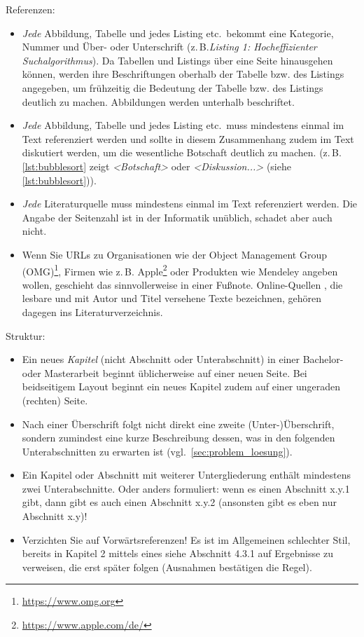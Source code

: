 \documentclass[11pt]{scrartcl}
\newcommand{\qto}[1]{\glqq #1\grqq}				%
\newcommand{\zB}{\mbox{z.\,B.}\xspace}
\newcommand{\bzw}{bzw.\xspace}
\begin{document}
\noindent
Referenzen:	
	\begin{itemize}
		\item \emph{Jede} Abbildung, Tabelle und jedes Listing etc.\ bekommt eine Kategorie, Nummer und Über- oder Unterschrift (\zB \emph{Listing 1: Hocheffizienter Suchalgorithmus}). 
		Da Tabellen und Listings über eine Seite hinausgehen können, werden ihre Beschriftungen oberhalb der Tabelle \bzw des Listings angegeben, um frühzeitig die Bedeutung der Tabelle \bzw des Listings deutlich zu machen. Abbildungen werden unterhalb beschriftet.
		\item \emph{Jede} Abbildung, Tabelle und jedes Listing etc.\ muss mindestens einmal im Text referenziert werden und sollte in diesem Zusammenhang zudem im Text diskutiert werden, um die wesentliche Botschaft deutlich zu machen. (\zB \qto{\cref{lst:bubblesort} zeigt \emph{<Botschaft>}} oder \qto{\emph{<Diskussion...>} (siehe \cref{lst:bubblesort})}). 
		\item \emph{Jede} Literaturquelle muss mindestens einmal im Text referenziert werden. Die Angabe der Seitenzahl ist in der Informatik unüblich, schadet aber auch nicht.
		\item Wenn Sie URLs zu Organisationen wie der Object Management Group (OMG)\footnote{\url{https://www.omg.org}}, Firmen wie \zB Apple\footnote{\url{https://www.apple.com/de/}} oder Produkten wie Mendeley angeben wollen, geschieht das sinnvollerweise in einer Fußnote. Online-Quellen \cite{lit:Gossman:MVVM}, die \qto{lesbare} und mit Autor und Titel versehene Texte bezeichnen, gehören dagegen ins Literaturverzeichnis.
	\end{itemize}
	
% 


\noindent
Struktur:
	\begin{itemize}
	 	\item Ein neues \emph{Kapitel} (nicht Abschnitt oder Unterabschnitt) in einer Bachelor- oder Masterarbeit beginnt üblicherweise auf einer neuen Seite. Bei beidseitigem Layout beginnt ein neues Kapitel zudem auf einer ungeraden (rechten) Seite.
	 	\item Nach einer Überschrift folgt nicht direkt eine zweite (Unter-)Überschrift, sondern zumindest eine kurze Beschreibung dessen, was in den folgenden Unterabschnitten zu erwarten ist (vgl.~\cref{sec:problem_loesung}).
	 	\item Ein Kapitel oder Abschnitt mit weiterer Untergliederung enthält mindestens zwei Unterabschnitte. Oder anders formuliert: wenn es einen Abschnitt x.y.1 gibt, dann gibt es auch einen Abschnitt x.y.2 (ansonsten gibt es eben nur Abschnitt x.y)!
	 	\item Verzichten Sie auf Vorwärtsreferenzen! Es ist im Allgemeinen schlechter Stil, bereits in Kapitel 2 mittels eines \qto{siehe Abschnitt 4.3.1} auf Ergebnisse zu verweisen, die erst später folgen (Ausnahmen bestätigen die Regel).
	\end{itemize}
\end{document}
